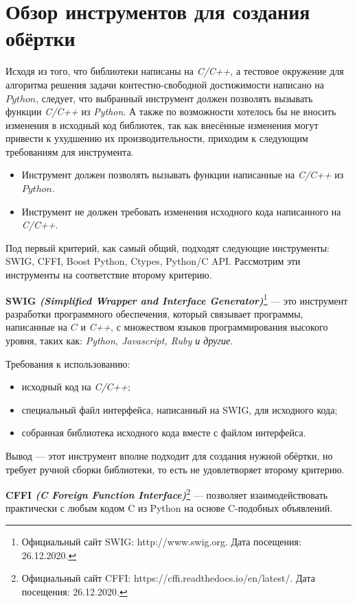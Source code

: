 \documentclass[14pt]{matmex-diploma}
\begin{document}
\section{Обзор инструментов для создания обёртки}
Исходя из того, что библиотеки написаны на \textit{C/C++}, а тестовое окружение
для алгоритма решения задачи контестно-свободной достижимости \cite{cfpq_matrix} написано на $Python$,
следует, что выбранный инструмент должен позволять вызывать функции \textit{C/C++} из \textit{Python}. 
А также по возможности хотелось бы не вносить изменения в исходный код библиотек, так как внесённые изменения
могут привести к ухудшению их производительности, приходим к следующим требованиям для инструмента.

\begin{itemize}
    \item Инструмент должен позволять вызывать функции написанные на \textit{C/C++} из $Python$.
    \item Инструмент не должен требовать изменения исходного кода написанного на \textit{C/C++}.
\end{itemize}

Под первый критерий, как самый общий, подходят следующие инструменты: SWIG, CFFI, Boost Python, Ctypes, Python/C API.
Рассмотрим эти инструменты на соответствие второму критерию.

\textbf{SWIG \textit{(Simplified Wrapper and Interface Generator)}}\footnote{
Официальный сайт SWIG: http://www.swig.org.
Дата посещения: 26.12.2020.}
--- это инструмент разработки программного обеспечения,
который связывает программы,
написанные на $C$ и \textit{C++}, с множеством языков программирования высокого уровня,
таких как: \textit{Python, Javascript, Ruby и другие}.

Требования к использованию:
\begin{itemize}
    \item исходный код на \textit{C/C++};
    \item специальный файл интерфейса, написанный на SWIG, для исходного кода;
    \item собранная библиотека исходного кода вместе с файлом интерфейса.
\end{itemize}

Вывод ---  этот инструмент вполне подходит для создания нужной
обёртки, но требует ручной сборки библиотеки, то есть не удовлетворяет второму критерию.

\textbf{CFFI \textit{(C Foreign Function Interface)}}\footnote{
Официальный сайт CFFI: https://cffi.readthedocs.io/en/latest/.
Дата посещения: 26.12.2020.}
--- 
позволяет взаимодействовать практически с любым кодом C из Python на основе C-подобных объявлений.
\end{document}
